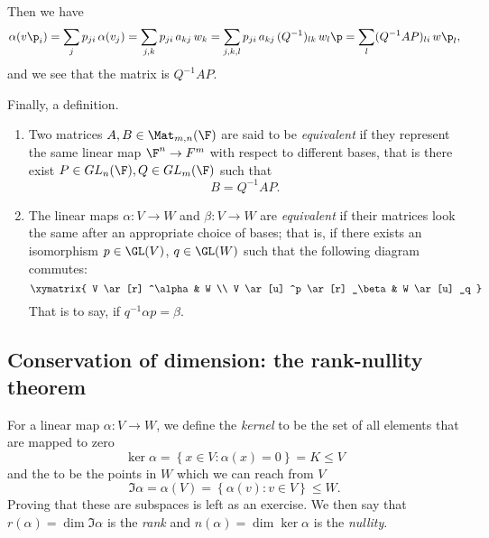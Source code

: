 Then we have
\begin{equation*}
	\alpha(v\p_i)
	= \sum_j p_{ji}\,\alpha(v_j)
	= \sum_{j,k} p_{ji} \, a_{kj} \, w_k
	= \sum_{j,k,l} p_{ji}\,a_{kj} \, (Q^{-1})_{lk} \, w_l\p %
	= \sum_l (Q^{-1}AP)_{li} \,w\p_l,
\end{equation*}
and we see that the matrix is $Q^{-1}AP$.

Finally, a definition.

\begin{definition}
	\mbox{}
	\begin{enumerate}
		\shortskip
		\item Two matrices $A, B \in \Mat_{m,n}(\F)$ are said to be \emph{equivalent} if they represent the same linear map $\F^n \to F^m$ with respect to different bases, that is there exist $P \in GL_n(\F), Q\in GL_m(\F)$ such that
		\begin{equation*}
			B = Q^{-1}AP.
		\end{equation*}
		\item The linear maps $\alpha:V\to W$ and $\beta:V\to W$ are \emph{equivalent} if their matrices look the same after an appropriate choice of bases; that is, if there exists an isomorphism $p\in\GL(V)$, $q\in\GL(W)$ such that the following diagram commutes: %
		\begin{equation*}
			\xymatrix{
				V
					\ar [r] ^\alpha
				&
				W \\
				V
					\ar [u] ^p
					\ar [r] _\beta
				&
				W
					\ar [u] _q
			}
		\end{equation*}
		That is to say, if $q^{-1}\alpha p=\beta$.
	\end{enumerate}
\end{definition}


	\pagebreak

\subsection{Conservation of dimension: the rank-nullity theorem} %
\label{sub:rank_nullity_theorem}

\begin{definition}
	For a linear map $\alpha:V\to W$, we define the \emph{kernel} to be the set of all elements that are mapped to zero %
	\begin{equation*}
		\ker \alpha = \left\{x\in V:\alpha(x) = 0\right\} = K \leq V
	\end{equation*}
	and the  to be the points in $W$ which we can reach from $V$ %
	\begin{equation*}
		\Im \alpha = \alpha(V) = \left\{\alpha(v) : v\in V\right\} \leq W.
	\end{equation*}
	Proving that these are subspaces is left as an exercise. We then say that $r(\alpha)=\dim \Im \alpha$ is the \emph{rank} and $n(\alpha)=\dim\ker\alpha$ is the \emph{nullity}. %
\end{definition}

